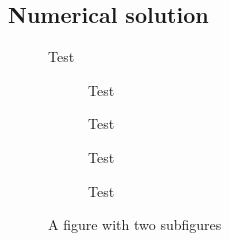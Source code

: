 
\subsection{Numerical solution}

\begin{figure}[h]
	\centering
	\vspace{-0.75cm}
	\fbox{}
%	
	\vspace{-0.50cm}
	\caption{Test}
	\label{fig:diagonal_N200_Pe1.0e+00}
\end{figure}

\begin{figure}[h]
	\centering
	\begin{subfigure}{.5\textwidth}
		\centering
		\vspace{-0.75cm}
		
		\vspace{-0.50cm}
		\caption{Test}
		\label{fig:diagonal_N200_Pe1.0e+01}
	\end{subfigure}%
	\begin{subfigure}{.5\textwidth}
		\centering
		\vspace{-0.75cm}
		
		\vspace{-0.50cm}
		\caption{Test}
		\label{fig:diagonal_N200_Pe1.0e+02}
	\end{subfigure}
	\begin{subfigure}{.5\textwidth}
		\centering
		\vspace{-0.25cm}
		
		\vspace{-0.50cm}
		\caption{Test}
		\label{fig:diagonal_N200_Pe1.0e+03}
	\end{subfigure}%
	\begin{subfigure}{.5\textwidth}
		\centering
		\vspace{-0.25cm}
		
		\vspace{-0.50cm}
		\caption{Test}
		\label{fig:diagonal_N200_Pe1.0e+04}
	\end{subfigure}
	\caption{A figure with two subfigures}
	\label{fig:diagonal_N200_Pe_greater_than_1}
\end{figure}


